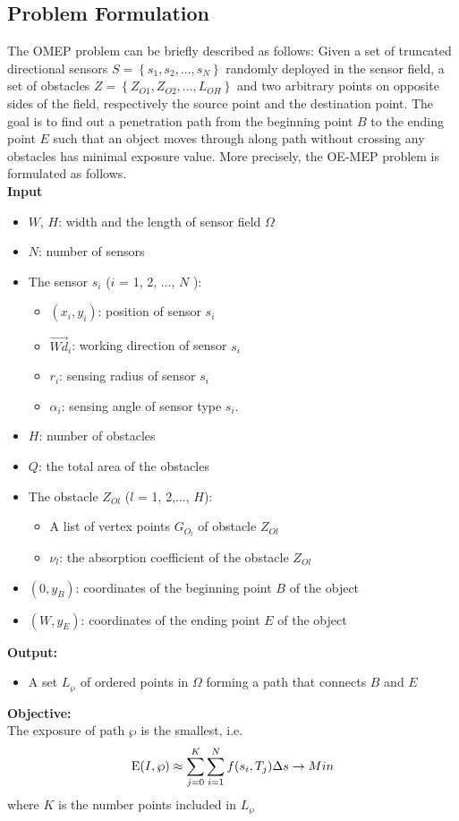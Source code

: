 \documentclass[final]{elsarticle}
\begin{document}
\subsection{Problem Formulation}
The OMEP problem can be briefly described as follows: Given a set of truncated directional sensors $S = \left\{ {{s_1},{s_2},...,{s_N}} \right\}$ randomly deployed in the sensor field, a set of obstacles $Z = \left\{ {{Z_{O1}},{Z_{O2}},...,{L_{OH}}} \right\}$ and two arbitrary points on opposite sides of the field, respectively the source point and the destination point. The goal is to find out a penetration path from the beginning point $B$ to the ending point $E$ such that an object moves through along path without crossing any obstacles has minimal exposure value. More precisely, the OE-MEP problem is formulated as follows.\\
\textbf{Input}
\begin{itemize}
		\itemsep-0.2em
		\item $W$, $H$: width and the length of sensor field $\Omega$
		\item $N$: number of sensors
		\item The sensor $s_i$ ($ i $ = 1, 2, ..., $ N $ ):
		\begin{itemize}
			 \item $({x_i},y_i)$: position of sensor $ s_i $
			 \item $\overrightarrow{Wd}_i$: working direction of sensor $s_i$
			 \item $ r_i $: sensing radius of sensor $ s_i $
			 \item ${\alpha _i}$: sensing angle of sensor type $ s_i $.
		 \end{itemize}
		 \item $H$: number of obstacles
		 \item $Q$: the total area of the obstacles 
		 \item The obstacle $Z_{Ol}$ ($ l $ = 1, 2,..., $H$): 
		 \begin{itemize}
		 	\item A list of vertex points $ G_{O_l} $ of obstacle $Z_{Ol}$
		 	\item $ \nu_l $: the absorption coefficient of the obstacle $Z_{Ol}$
		 \end{itemize}
		\item $(0, y_B)$: coordinates of the beginning point $B$ of the object
		\item $(W, y_E)$: coordinates of the ending point $E$ of the object
\end{itemize}
\textbf{Output:}
\begin{itemize}
	\item A set ${L_\wp }$ of ordered points in $\Omega $ forming a path that connects $ B $ and $ E $ 
\end{itemize}
\textbf{Objective:}\\
The exposure of path  $\wp $ is the smallest, i.e.
\begin{equation}
\label{eq9}
{\rm E}(I,\wp )  \approx \sum\limits_{j = 0}^K {\sum\limits_{i = 1}^N {f({s_i},{T_j})} } \Delta s  \to Min
\end{equation}
where $ K $ is the number points included in ${L_\wp }$
\end{document}
